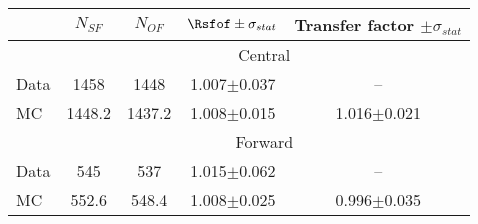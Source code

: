 
\begin{table}[hbtp]
 \renewcommand{\arraystretch}{1.3}
 \setlength{\belowcaptionskip}{6pt}
 \centering
 \caption{
     }
  \label{tab:rSFOF}
\begin{tabular}{l|c|c|c|c}     
 & $N_{SF}$ & $N_{OF}$ & $ \Rsfof \pm \sigma_{stat}$ & Transfer factor $\pm \sigma_{stat}$  \\    
\hline
 & \multicolumn{4}{c}{Central} \\
\hline
 Data & 1458 & 1448 & 1.007$\pm$0.037 & -- \\
 MC & 1448.2 & 1437.2 & 1.008$\pm$0.015 & 1.016$\pm$0.021\\
 
 
    \hline 
& \multicolumn{4}{c}{Forward} \\
\hline
 Data & 545 & 537 & 1.015$\pm$0.062 & -- \\
 MC & 552.6 & 548.4 & 1.008$\pm$0.025 & 0.996$\pm$0.035\\


  
\end{tabular}  
\end{table}

